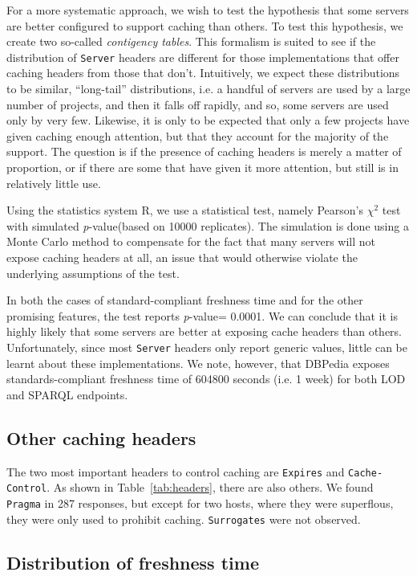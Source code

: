 \documentclass{llncs}
\newcommand{\pvalue}{\textit{p}-value}
\newcommand{\httph}[1]{\texttt{#1}}
\begin{document}
For a more systematic approach, we wish to test the hypothesis that
some servers are better configured to support caching than others. To
test this hypothesis, we create two so-called \emph{contigency
  tables}\cite{kn:bj}. This formalism is suited to see if the
distribution of  \httph{Server} headers are different for those implementations that
offer caching headers from those that don't. Intuitively, we expect
these distributions to be similar, ``long-tail'' distributions, i.e. a
handful of servers are used by a large number of projects, and then it
falls off rapidly, and so, some servers are used only by very
few. Likewise, it is only to be expected that only a few projects have
given caching enough attention, but that they account for the majority
of the support. The question is if the presence of caching headers is
merely a matter of proportion, or if there are some that have given it
more attention, but still is in relatively little use.

Using the statistics system R\cite{kn:r}, we use a statistical test,
namely Pearson's $\chi^2$ test with simulated \pvalue (based on 10000
replicates). The simulation is done using a Monte Carlo method to
compensate for the fact that many servers will not expose caching
headers at all, an issue that would otherwise violate the underlying
assumptions of the test.

In both the cases of standard-compliant freshness time and for the
other promising features, the test reports \pvalue = 0.0001. We can
conclude that it is highly likely that some servers are better at
exposing cache headers than others. Unfortunately, since most
\httph{Server} headers only report generic values, little can be
learnt about these implementations. We note, however, that DBPedia
exposes standards-compliant freshness time of 604800 seconds (i.e. 1
week) for both LOD and SPARQL endpoints.

\subsection{Other caching headers}

The two most important headers to control caching are \httph{Expires}
and \httph{Cache-Control}. As shown in Table~\ref{tab:headers}, there
are also others. We found \httph{Pragma} in 287 responses, but except
for two hosts, where they were superflous, they were only used to
prohibit caching. \httph{Surrogates} were not observed.

\subsection{Distribution of freshness time}
\end{document}
